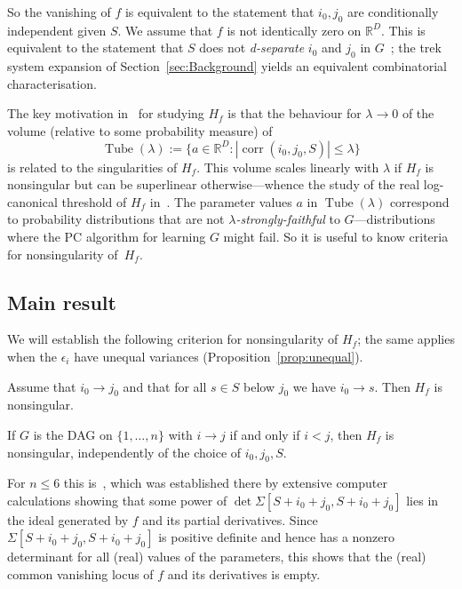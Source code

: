 \documentclass[ALCO,ThmDefs,Unicode]{cedram}
\DeclareMathOperator{\Tube}{Tube}
\DeclareMathOperator{\corr}{corr}
\newcommand{\RR}{\mathbb{R}}
\begin{document}
So the vanishing of $f$ is equivalent to the statement that $i_0,j_0$ are conditionally independent given $S$. We assume that $f$ is not identically zero on $\RR^D$. This is equivalent to the statement that $S$ does not \emph{d-separate} $i_0$ and $j_0$ in $G$~\cite[Section~2.3.4]{Spirtes01}; the trek system expansion of Section~\ref{sec:Background} yields an equivalent combinatorial characterisation.

The key motivation in~\cite{Uhler14} for studying $H_f$ is that the behaviour for $\lambda \to 0$ of the volume (relative to some probability measure) of
\[
\Tube(\lambda):=\{a \in \RR^D : |{\corr(i_0,j_0,S)}| \leq \lambda\}
\]
is related to the singularities of $H_f$. This volume scales linearly with $\lambda$ if $H_f$ is nonsingular but can be superlinear otherwise---whence the study of the real log-canonical threshold of $H_f$ in~\cite{Uhler14}. The parameter values $a$ in $\Tube(\lambda)$ correspond to probability distributions that are not \emph{$\lambda$-strongly-faithful} to $G$---distributions where the PC algorithm for learning $G$ might fail. So it is useful to know criteria for nonsingularity of~$H_f$.

\subsection*{Main result}

We will establish the following criterion for nonsingularity of $H_f$; the same applies when the $\epsilon_i$ have unequal variances (Proposition~\ref{prop:unequal}).

\begin{theo}
Assume that $i_0 \to j_0$ and that for all $s \in S$ below $j_0$ we have $i_0 \to s$. Then $H_f$ is nonsingular.
\end{theo}

\begin{coro}
If $G$ is the DAG on $\{1,\ldots,n\}$ with $i \to j$ if and only if $i<j$, then $H_f$ is nonsingular, independently of the choice of $i_0,j_0,S$.
\end{coro}

For $n \leq 6$ this is~\cite[Theorem~4.1]{Uhler14}, which was established there by extensive computer calculations showing that some power of $\det \Sigma[S+i_0+j_0,S+i_0+j_0]$ lies in the ideal generated by $f$ and its partial derivatives. Since $\Sigma[S+i_0+j_0,S+i_0+j_0]$ is positive definite and hence has a nonzero determinant for all (real) values of the parameters, this shows that the (real) common vanishing locus of $f$ and its derivatives is empty.
\end{document}
